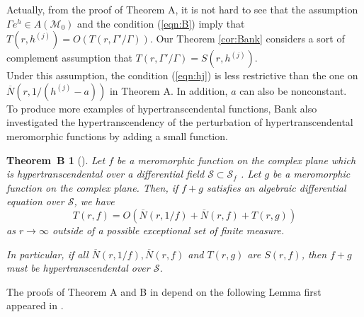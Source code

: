 \documentclass[reqno,12pt]{amsart}
\newtheorem*{thmB}{Theorem~B}
\newtheorem{rmk}{Remark}
\begin{document}
 Actually, from the proof of Theorem A, it is not hard to see that the assumption $\Gamma e^h\in A(\mathcal{M}_0)$ and the condition (\ref{eqn:B}) imply that $T(r, h^{(j)})=O(T(r, \Gamma'/\Gamma))$. Our Theorem \ref{cor:Bank} considers a sort of complement assumption that $T(r, \Gamma'/\Gamma)=S(r, h^{(j)})$.\\
 Under this assumption, the condition (\ref{eqn:hj}) is less restrictive than the one on $\overline N(r, 1/(h^{(j)}-a))$ in Theorem A. In addition, $a$ can also be nonconstant.\\


To produce more examples of hypertranscendental functions, Bank also investigated the hypertranscendency of the perturbation of hypertranscendental  meromorphic functions  by adding a small function.

 \begin{thmB}[\cite{Bank80}]\label{thm:B}
 Let $f$ be a meromorphic function on the complex plane which is hypertranscendental over a differential field $\mathcal{S}\subset\mathcal{S}_f$ . Let $g$ be a meromorphic function on the complex plane. Then, if $f+g$ satisfies an algebraic differential equation over $\mathcal{S}$, we have $$T(r, f)=O(\overline N(r, 1/f)+\overline N(r, f) +T(r, g))$$ as $r\rightarrow\infty$ outside of a possible exceptional set of finite measure. 
 
 In particular, if all $\overline N(r,1/f), \overline N(r, f)$ and $T(r, g)$ are $S(r, f)$, then $f+g$ must be hypertranscendental over $\mathcal{S}$.
 \end{thmB}
 
 
The proofs of Theorem A and B in \cite{Bank77, Bank80} depend on the following Lemma first appeared in \cite{Bank761}.
 
\end{document}
